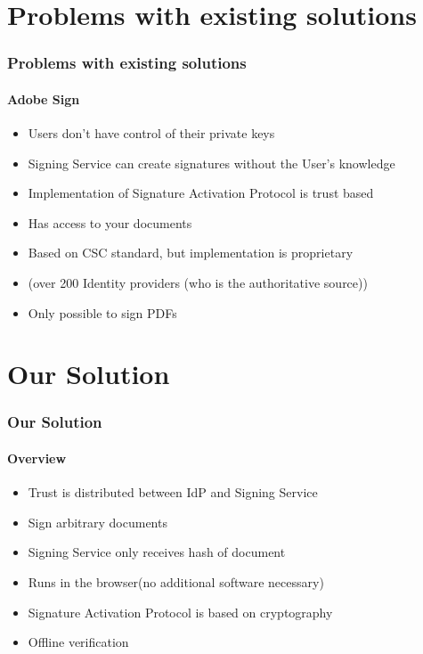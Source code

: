 \section{Problems with existing solutions}
\sectionpage


\begin{frame}[t]\frametitle{Problems with existing solutions}
	\framesubtitle{Adobe Sign}
	\begin{itemize}
	  \item Users don't have control of their private keys
      \item Signing Service can create signatures without the User's knowledge
      \item Implementation of Signature Activation Protocol is trust based
      \item Has access to your documents
	  \item Based on CSC standard, but implementation is proprietary
	  \item (over 200 Identity providers (who is the authoritative source))
	  \item Only possible to sign PDFs
	\end{itemize}
\end{frame}


\section{Our Solution}
\sectionpage

\begin{frame}[t]\frametitle{Our Solution}
	\framesubtitle{Overview}
	\begin{itemize}
		\item Trust is distributed between IdP and Signing Service
		\item Sign arbitrary documents
		\item Signing Service only receives hash of document
		\item Runs in the browser(no additional software necessary)
		\item Signature Activation Protocol is based on cryptography
		\item Offline verification
	\end{itemize}
\end{frame}

